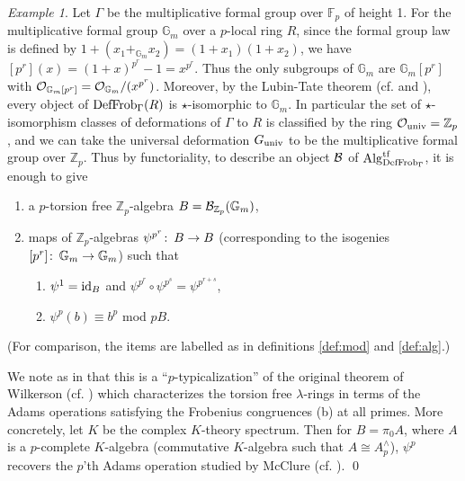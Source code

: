 \documentclass{gtpart}
\theoremstyle{definition}
\theoremstyle{remark}
\newtheorem{exam}[thm]{Example}
\def\co{\colon\thinspace}
\newcommand{\mb}[1]{\mathbb{#1}}
\newcommand{\Alg}{{\rm Alg}}
\newcommand{\CO}{{\cal O}}
\newcommand{\DF}{{{\rm DefFrob}_\Gamma}}
\newcommand{\Gm}{{{\mb G}_m}}
\begin{document}
\begin{exam}
\label{ex:K}
 Let $\Gamma$ be the multiplicative formal group over ${\mb F}_p$ of height 1.  
 For the multiplicative formal group $\Gm$ over a $p$-local ring $R$, since 
 the formal group law is defined by $1 + (x_1 +_\Gm x_2) = 
 (1 + x_1)(1 + x_2)$, we have $[p^r](x) = (1 + x)^{p^r} - 1 = x^{p^r}$.  Thus 
 the only subgroups of $\Gm$ are $\Gm [p^r]$ with $\CO_{\Gm [p^r]} = 
 \CO_\Gm / (x^{p^r})$.  Moreover, by the Lubin-Tate theorem (cf. 
 \cite[theorem 3.1]{lubintate} and \cite[section 4.3]{H-Mthm}), every object 
 of $\DF(R)$ is $\star$-isomorphic to $\Gm$.  In particular the set of 
 $\star$-isomorphism classes of deformations of $\Gamma$ to $R$ is classified 
 by the ring $\CO_{\rm univ} = {\mb Z}_p$, and we can take the universal 
 deformation $G_{\rm univ}$ to be the multiplicative formal group over 
 ${\mb Z}_p$.  Thus by functoriality, to describe an object ${\cal B}$ of 
 $\Alg_\DF^{\rm tf}$, it is enough to give 
 \begin{enumerate}
  \item a $p$-torsion free ${\mb Z}_p$-algebra $B = 
  {\cal B}_{{\mb Z}_p}(\Gm)$, 
  \item maps of ${\mb Z}_p$-algebras $\psi^{p^r}\co B \to B$ (corresponding to 
  the isogenies $[p^r]\co \Gm \to \Gm$) such that 
  \begin{enumerate}
   \item $\psi^1 = {\rm id}_B$ and $\psi^{p^r} \circ \psi^{p^s} = 
   \psi^{p^{r+s}}$, 
   \item $\psi^p(b) \equiv b^p$ mod $pB$.  
  \end{enumerate}
 \end{enumerate}
 (For comparison, the items are labelled as in definitions \ref{def:mod} and 
 \ref{def:alg}.)  

 We note as in \cite[example 1.3]{cong} that this is a ``$p$-typicalization'' 
 of the original theorem of Wilkerson (cf. \cite[proposition 1.2]{wilkerson}) 
 which characterizes the torsion free $\lambda$-rings in terms of the Adams 
 operations satisfying the Frobenius congruences (b) at all primes.  More 
 concretely, let $K$ be the complex $K$-theory spectrum.  Then for 
 $B = \pi_0 A$, where $A$ is a $p$-complete $K$-algebra (commutative 
 $K$-algebra such that $A \cong A_p^\wedge$), $\psi^p$ recovers the $p$'th 
 Adams operation studied by McClure (cf. \cite[chapters VIII and IX]{BMMS}).  
 \qed
\end{exam}
\end{document}
